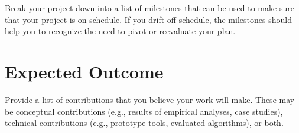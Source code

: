 \documentclass[conference]{IEEEtran}
\begin{document}
Break your project down into a list of milestones that can be used to make sure that your project is on schedule.
If you drift off schedule, the milestones should help you to recognize the need to pivot or reevaluate your plan.

\section{Expected Outcome}

Provide a list of contributions that you believe your work will make.
These may be conceptual contributions (e.g., results of empirical analyses, case studies), technical contributions (e.g., prototype tools, evaluated algorithms), or both.



\end{document}

